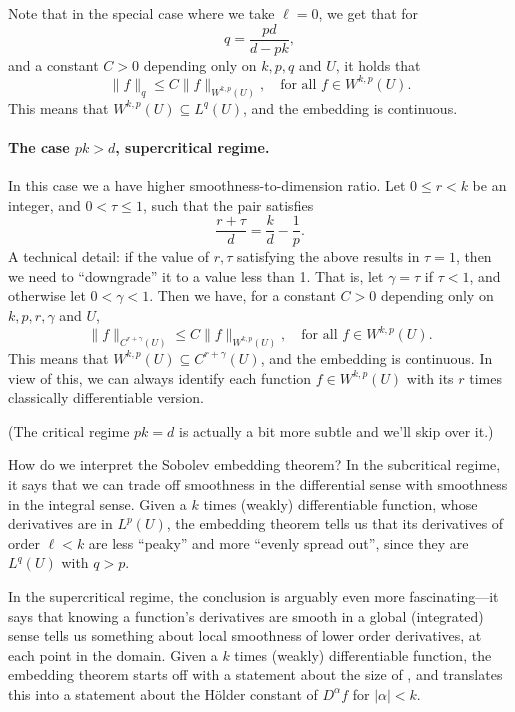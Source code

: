 \documentclass{article}
\begin{document}
Note that in the special case where we take $\ell = 0$, we get that for  
\[
q = \frac{pd}{d-pk},
\]
and a constant $C>0$ depending only on $k,p,q$ and $U$, it holds that 
\[
\|f\|_q \leq C \|f\|_{W^{k,p}(U)}, \quad \text{for all $f \in W^{k,p}(U)$}. 
\]
This means that $W^{k,p}(U) \subseteq L^q(U)$, and the embedding is continuous.  


\paragraph{The case $pk > d$, supercritical regime.}

In this case we a have higher smoothness-to-dimension ratio. Let $0 \leq r < k$
be an integer, and $0 < \tau \leq 1$, such that the pair satisfies 
\[
\frac{r+\tau}{d} = \frac{k}{d} - \frac{1}{p}.
\]
A technical detail: if the value of $r,\tau$ satisfying the above results in
$\tau = 1$, then we need to ``downgrade'' it to a value less than 1. That is,
let $\gamma = \tau$ if $\tau < 1$, and otherwise let $0 < \gamma < 1$. Then we
have, for a constant $C>0$ depending only on $k,p,r,\gamma$ and $U$,       
\[
\|f\|_{C^{r+\gamma}(U)} \leq C \|f\|_{W^{k,p}(U)}, \quad \text{for all $f \in
  W^{k,p}(U)$}. 
\]
This means that $W^{k,p}(U) \subseteq C^{r+\gamma}(U)$, and the embedding is
continuous. In view of this, we can always identify each function $f \in
W^{k,p}(U)$ with its $r$ times classically differentiable version.     


\medskip
(The critical regime $pk = d$ is actually a bit more subtle and we'll skip over
it.)  

How do we interpret the Sobolev embedding theorem? In the subcritical regime, it
says that we can trade off smoothness in the differential sense with smoothness
in the integral sense. Given a $k$ times (weakly) differentiable function, whose
derivatives are in $L^p(U)$, the embedding theorem tells us that its derivatives
of order $\ell < k$ are less ``peaky'' and more ``evenly spread out'', since
they are $L^q(U)$ with $q > p$.

In the supercritical regime, the conclusion is arguably even more
fascinating---it says that knowing a function's derivatives are smooth in a
global (integrated) sense tells us something about local smoothness of lower
order derivatives, at each point in the domain. Given a $k$ times (weakly)
differentiable function, the embedding theorem starts off with a statement about
the size of , and
translates this into a statement about the H{\"o}lder constant of $D^\alpha f$
for $|\alpha| < k$.      
\end{document}
